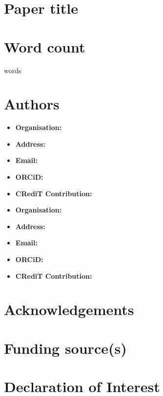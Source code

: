 \section{Paper title}

\section{Word count}
 words

\section{Authors}
{\large\textbf{}}
\begin{itemize}
    \item \textbf{Organisation:} 
    \item \textbf{Address:} 
    \item \textbf{Email:} 
    \item \textbf{ORCiD:} 
    \item \textbf{CRediT Contribution:} 
\end{itemize}

{\large\textbf{}}
\begin{itemize}
    \item \textbf{Organisation:} 
    \item \textbf{Address:} 
    \item \textbf{Email:} 
    \item \textbf{ORCiD:} 
    \item \textbf{CRediT Contribution:} 
\end{itemize}




\section{Acknowledgements}

\section{Funding source(s)}

\section{Declaration of Interest}

